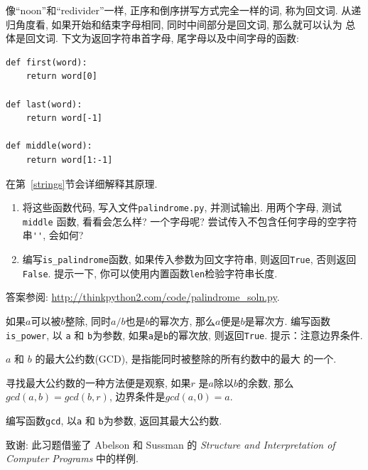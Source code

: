 \documentclass[10pt]{book}
\begin{document}
\begin{exercise}
\label{palindrome}

像``noon''和``redivider''一样, 正序和倒序拼写方式完全一样的词, 称为回文词. 
从递归角度看, 如果开始和结束字母相同, 同时中间部分是回文词, 那么就可以认为
总体是回文词. 
下文为返回字符串首字母, 尾字母以及中间字母的函数:

\begin{verbatim}
def first(word):
    return word[0]

def last(word):
    return word[-1]

def middle(word):
    return word[1:-1]
\end{verbatim}
%

在第~\ref{strings}节会详细解释其原理.

\begin{enumerate}

\item 将这些函数代码, 写入文件{\tt palindrome.py}, 并测试输出. 
用两个字母, 测试 {\tt middle} 函数, 看看会怎么样? 一个字母呢?  
尝试传入不包含任何字母的空字符串\verb"''",  会如何?

\item 编写\verb"is_palindrome"函数, 如果传入参数为回文字符串, 
则返回{\tt True},  否则返回{\tt False}. 
提示一下, 你可以使用内置函数{\tt len}检验字符串长度. 

\end{enumerate}

答案参阅: \url{http://thinkpython2.com/code/palindrome_soln.py}.

\end{exercise}

\begin{exercise}

如果$a$可以被$b$整除, 同时$a/b$也是$b$的幂次方, 那么$a$便是$b$是幂次方. 
编写函数\verb"is_power", 
以 {\tt a} 和 {\tt b}为参数, 如果{\tt a}是{\tt b}的幂次放, 则返回{\tt True}. 
提示：注意边界条件. 

\end{exercise}


\begin{exercise}

 $a$ 和 $b$ 的最大公约数(GCD), 是指能同时被整除的所有约数中的最大
的一个. 

寻找最大公约数的一种方法便是观察, 如果$r$ 是$a$除以$b$的余数, 
那么$gcd(a, b) = gcd(b, r)$, 边界条件是$gcd(a, 0) = a$.

编写函数\verb"gcd", 以{\tt a} 和 {\tt b}为参数, 返回其最大公约数. 


致谢: 此习题借鉴了 Abelson 和
Sussman 的 {\em Structure and Interpretation of Computer Programs} 中的样例.

\end{exercise}
\end{document}
